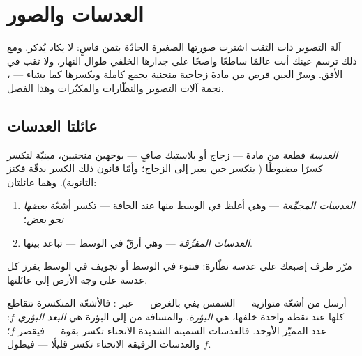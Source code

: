 \chapter{العدسات والصور}\label{ch:g8:lenses-images}

آلة التصوير ذات الثقب اشترت صورتها الصغيرة الحادّة بثمن قاسٍ:
 لا يكاد يُذكر. ومع ذلك ترسم عينك أنت عالمًا ساطعًا واضحًا
على جدارها الخلفي طوال النهار، ولا ثقب في الأفق. وسرّ العين
قرص من مادة زجاجية منحنية يجمع  كاملة ويكسرها كما يشاء ---
، نجمة آلات التصوير والنظّارات والمكبّرات وهذا الفصل.

\section{عائلتا العدسات}

\begin{definition}\label{def:g8:lenses-images:families}
\emph{العدسة} قطعة من مادة  --- زجاج أو
بلاستيك صافٍ --- بوجهين منحنيين، مبنيّة لتكسر  كسرًا
مضبوطًا ( ينكسر حين يعبر إلى الزجاج؛ وأمّا قانون ذلك
الكسر بدقّة فكنز الثانوية). وهما عائلتان:
\begin{enumerate}
  \item \emph{العدسات المجمِّعة} ---
        وهي أغلظ في الوسط منها عند الحافة --- تكسر أشعّة
         \emph{بعضها نحو بعض}؛
  \item \emph{العدسات المفرِّقة} --- وهي
        أرقّ في الوسط --- تباعد بينها.
\end{enumerate}
مرّر طرف إصبعك على عدسة نظّارة: فنتوء في الوسط أو تجويف في
الوسط يفرز كل عدسة على وجه الأرض إلى عائلتها.
\end{definition}

\begin{definition}\label{def:g8:lenses-images:focus}
أرسل  من أشعّة متوازية ---  الشمس يفي بالغرض --- عبر
: فالأشعّة المنكسرة تتقاطع كلها عند نقطة واحدة
خلفها، هي \emph{البؤرة}. والمسافة من  إلى
البؤرة هي \emph{البعد البؤري} $f$: عدد 
المميّز الأوحد. فالعدسات السمينة الشديدة الانحناء تكسر بقوة ---
فيقصر $f$؛ والعدسات الرقيقة الانحناء تكسر قليلًا --- فيطول
$f$.
\end{definition}

